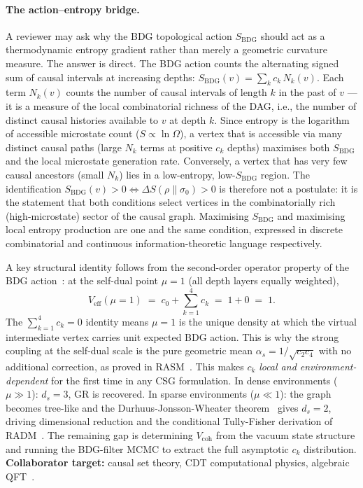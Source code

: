\documentclass[11pt,a4paper]{article}
\theoremstyle{plain}
\theoremstyle{definition}
\theoremstyle{remark}
\begin{document}
\begin{description}
  \paragraph{The action--entropy bridge.}
  A reviewer may ask why the BDG topological action $S_{\mathrm{BDG}}$ should
  act as a thermodynamic entropy gradient rather than merely a geometric curvature
  measure. The answer is direct. The BDG action counts the alternating signed
  sum of causal intervals at increasing depths:
  $S_{\mathrm{BDG}}(v) = \sum_k c_k\,N_k(v)$.
  Each term $N_k(v)$ counts the number of causal intervals of length $k$
  in the past of $v$ --- it is a measure of the local combinatorial richness
  of the DAG, i.e., the number of distinct causal histories available to $v$
  at depth $k$.
  Since entropy is the logarithm of accessible microstate count
  ($S \propto \ln \Omega$), a vertex that is accessible via many distinct
  causal paths (large $N_k$ terms at positive $c_k$ depths) maximises both
  $S_{\mathrm{BDG}}$ and the local microstate generation rate.
  Conversely, a vertex that has very few causal ancestors (small $N_k$) lies in
  a low-entropy, low-$S_{\mathrm{BDG}}$ region.
  The identification $S_{\mathrm{BDG}}(v) > 0 \Leftrightarrow
  \Delta S(\rho \| \sigma_0) > 0$ is therefore not a postulate: it is the
  statement that both conditions select vertices in the
  combinatorially rich (high-microstate) sector of the causal graph.
  Maximising $S_{\mathrm{BDG}}$ and maximising local entropy production are
  one and the same condition, expressed in discrete combinatorial and continuous
  information-theoretic language respectively.

  A key structural identity follows from the second-order operator property
  of the BDG action~\citep{Glaser2014}: at the self-dual point $\mu=1$
  (all depth layers equally weighted),
  \begin{equation}
    V_{\mathrm{eff}}(\mu=1) \;=\; c_0 + \textstyle\sum_{k=1}^4 c_k
    \;=\; 1 + 0 \;=\; 1.
    \label{eq:veff1_eb}
  \end{equation}
  The $\sum_{k=1}^4 c_k = 0$ identity means $\mu=1$ is the unique density at
  which the virtual intermediate vertex carries unit expected BDG action.
  This is why the strong coupling at the self-dual scale is the pure
  geometric mean $\alpha_s = 1/\!\sqrt{c_2 c_4}$ with no additional correction,
  as proved in RASM~\citep{Sandeman2026RASM,Sandeman2026BDG}.
  This makes $c_k$ \emph{local and environment-dependent} for the first time in
  any CSG formulation. In dense environments ($\mu \gg 1$): $d_s = 3$, GR is
  recovered. In sparse environments ($\mu \ll 1$): the graph becomes tree-like
  and the Durhuus-Jonsson-Wheater theorem~\citep{Durhuus2010} gives $d_s = 2$,
  driving dimensional reduction and the conditional Tully-Fisher derivation of
  RADM~\citep{Sandeman2026RADM}. The remaining gap is determining $V_{\mathrm{coh}}$
  from the vacuum state structure and running the BDG-filter MCMC to extract
  the full asymptotic $c_k$ distribution.
  \textbf{Collaborator target:} causal set theory, CDT computational physics,
  algebraic QFT~\citep{Dowker2005,RideoutSorkin2000}.


\end{description}
\end{document}
